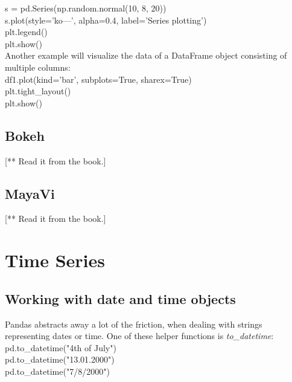 \documentclass{article}
\numberwithin{equation}{section} %
\begin{document}
s = pd.Series(np.random.normal(10, 8, 20)) \\

s.plot(style='ko—', alpha=0.4, label='Series plotting') \\

plt.legend()\\

plt.show() \\

Another example will visualize the data of a DataFrame object consisting of multiple columns: \\

df1.plot(kind='bar', subplots=True, sharex=True) \\

plt.tight\_layout() \\

plt.show() \\

\subsection*{Bokeh}

[** Read it from the book.]

\subsection*{MayaVi}

[** Read it from the book.]



\section*{Time Series}

\subsection*{Working with date and time objects}

Pandas abstracts away a lot of the friction, when dealing with strings representing dates or time. One of these helper functions is \textit{to\_datetime}: \\

pd.to\_datetime("4th of July") \\

pd.to\_datetime("13.01.2000") \\

pd.to\_datetime("7/8/2000") \\
\end{document}
